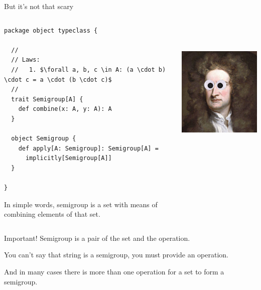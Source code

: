 \documentclass[presentation,aspectratio=169,smaller]{beamer}
\begin{document}
\begin{frame}[label={sec:org2ba6d17},fragile]{But it’s not that scary}
 \begin{columns}
\begin{column}{0.5\columnwidth}
\begin{verbatim}
package object typeclass {

  //
  // Laws:
  //   1. $\forall a, b, c \in A: (a \cdot b) \cdot c = a \cdot (b \cdot c)$
  //
  trait Semigroup[A] {
    def combine(x: A, y: A): A
  }

  object Semigroup {
    def apply[A: Semigroup]: Semigroup[A] =
      implicitly[Semigroup[A]]
  }

}
\end{verbatim}

\pause

In simple words, semigroup is a set with means of combining elements of that
set.

\pause
\end{column}

\begin{column}{0.5\columnwidth}
\begin{center}
\includegraphics[height=7cm]{images/scary.png}
\end{center}
\end{column}
\end{columns}
\end{frame}

\begin{frame}[label={sec:org7274fd5}]{Important!}
Semigroup is a pair of the set and the operation.

You can’t say that string is a semigroup, you must provide an operation.

And in many cases there is more than one operation for a set to form a
semigroup.
\end{frame}
\end{document}
